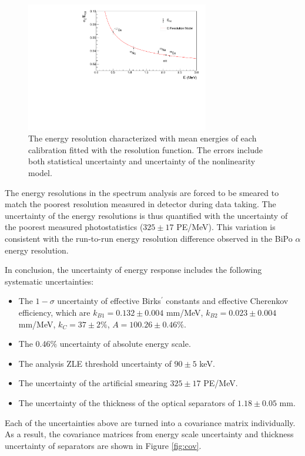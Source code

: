 \begin{figure}[h!]
\centering
\includegraphics[width=80mm]{Figures/PRDResolution.pdf}
\caption[Energy resolution function fitting to the standard deviations of gamma calibration spectra]{The energy resolution characterized with mean energies of each calibration fitted with the resolution function. 
The errors include both statistical uncertainty and uncertainty of the nonlinearity model.}
\label{fig:resolution}
\end{figure}

The energy resolutions in the spectrum analysis are forced to be smeared to match the poorest resolution measured in detector during data taking.
The uncertainty of the energy resolutions is thus quantified with the uncertainty of the poorest measured photostatistics ($325\pm17$ PE/MeV).
This variation is consistent with the run-to-run energy resolution difference observed in the BiPo $\alpha$ energy resolution.

In conclusion, the uncertainty of energy response includes the following systematic uncertainties:
\begin{itemize}
    \item The $1-\sigma$ uncertainty of effective Birks$^\prime$ constants and effective Cherenkov efficiency, which are $k_{B1} = 0.132 \pm 0.004$ mm/MeV, $k_{B2} = 0.023 \pm 0.004$ mm/MeV, $k_C = 37 \pm 2\%$, $A = 100.26\pm0.46\%$.
    \item The 0.46\% uncertainty of absolute energy scale.
    \item The analysis ZLE threshold uncertainty of $90\pm5$ keV.
    \item The uncertainty of the artificial smearing $325\pm17$ PE/MeV.
    \item The uncertainty of the thickness of the optical separators of $1.18\pm0.05$ mm.
\end{itemize}
Each of the uncertainties above are turned into a covariance matrix individually. 
As a result, the covariance matrices from energy scale uncertainty and thickness uncertainty of separators are shown in Figure \ref{fig:cov}.

